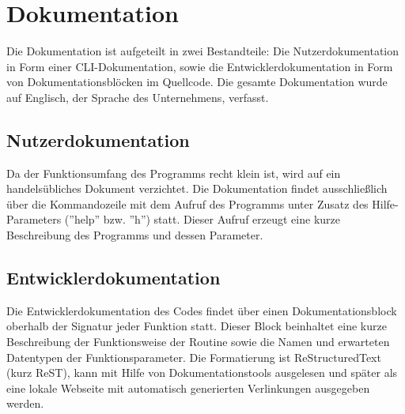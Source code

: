 \section{Dokumentation}
\label{section:dokumentationsphase}
Die Dokumentation ist aufgeteilt in zwei Bestandteile: Die Nutzerdokumentation
in Form einer CLI-Dokumentation, sowie die Entwicklerdokumentation in Form von
Dokumentationsblöcken im Quellcode. Die gesamte Dokumentation wurde auf Englisch,
der Sprache des Unternehmens, verfasst.

\subsection{Nutzerdokumentation}
Da der Funktionsumfang des Programms recht klein ist, wird auf ein handelsübliches
Dokument verzichtet. Die Dokumentation findet ausschließlich über die Kommandozeile mit dem Aufruf des Programms unter Zusatz des Hilfe-Parameters (''help'' bzw. ''h'') statt.
Dieser Aufruf erzeugt eine kurze Beschreibung des Programms und dessen Parameter.

\subsection{Entwicklerdokumentation}
Die Entwicklerdokumentation des Codes findet über einen
Dokumentationsblock oberhalb der Signatur jeder Funktion statt. Dieser Block
beinhaltet eine kurze Beschreibung der Funktionsweise der Routine sowie die
Namen und erwarteten Datentypen der Funktionsparameter. Die Formatierung ist
ReStructuredText (kurz ReST), kann mit Hilfe von Dokumentationstools ausgelesen
und später als eine lokale Webseite mit automatisch generierten Verlinkungen ausgegeben werden.
